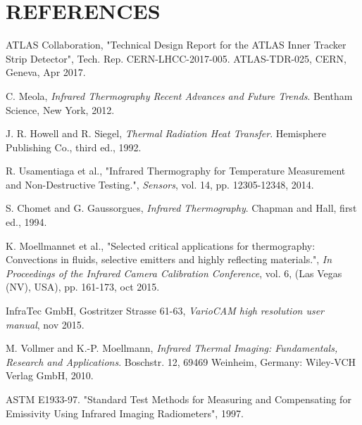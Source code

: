 \pagestyle{references}

\section*{\uppercase{References}}\label{referen}
	\bigskip
	\bigskip
	\begin{enumerate}[label={[\arabic*]}]
	
		\item ATLAS Collaboration, "Technical Design Report for the ATLAS Inner Tracker Strip Detector", Tech. Rep. CERN-LHCC-2017-005. ATLAS-TDR-025, CERN, Geneva, Apr 2017.
		
		\item C. Meola,	\textit{Infrared Thermography Recent Advances and Future Trends}. Bentham Science, New York, 2012.
		
		\item J. R. Howell and R. Siegel, \textit{Thermal Radiation Heat Transfer}. Hemisphere Publishing Co., third ed., 1992.
		
		\item R. Usamentiaga et al., "Infrared Thermography for Temperature Measurement and Non-Destructive Testing.", \textit{Sensors}, vol. 14, pp. 12305-12348, 2014.
		 
		\item S. Chomet and G. Gaussorgues, \textit{Infrared Thermography}. Chapman and Hall, first ed., 1994.
		
		\item K. Moellmannet et al., "Selected critical applications for thermography: Convections in fluids, selective emitters and highly reflecting materials.", \textit{In Proceedings of the Infrared Camera Calibration Conference}, vol. 6, (Las Vegas (NV), USA), pp. 161-173, oct 2015.
		
		\item InfraTec GmbH, Gostritzer Strasse 61-63, \textit{VarioCAM \textregistered\space high resolution user manual}, nov 2015.
		
		\item M. Vollmer and K.-P. Moellmann,	\textit{Infrared Thermal Imaging: Fundamentals, Research and Applications}. Boschstr. 12, 69469 Weinheim, Germany: Wiley-VCH Verlag GmbH, 2010.
		
		\item ASTM E1933-97. "Standard Test Methods for Measuring and Compensating for Emissivity Using Infrared Imaging Radiometers", 1997.
		

\end{enumerate}
